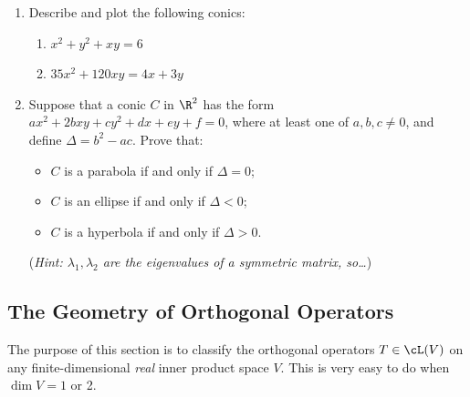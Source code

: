 \begin{exercises}
\begin{enumerate}[label=\thesubsection.\arabic*., align=right]
  \item Describe and plot the following conics:
  \begin{enumerate}
    \item $x^2+y^2+xy=6$
    
    \item $35x^2+120xy=4x+3y$
  \end{enumerate}
  
  \item Suppose that a conic $C$ in $\R^2$ has the form $ax^2+2bxy+cy^2+dx+ey+f=0$, where at least one of $a,b,c\neq 0$, and define $\Delta=b^2-ac$. Prove that:
  \begin{itemize}
    \item $C$ is a parabola if and only if $\Delta=0$;
    \item $C$ is an ellipse if and only if $\Delta<0$;
    \item $C$ is a hyperbola if and only if $\Delta>0$.
  \end{itemize}
  (\emph{Hint: $\lambda_1,\lambda_2$ are the eigenvalues of a symmetric matrix, so\ldots})
  
\end{enumerate}
\end{exercises}\clearpage

\setcounter{subsection}{10}
\subsection{The Geometry of Orthogonal Operators}

The purpose of this section is to classify the orthogonal operators $T\in\cL(V)$ on any finite-dimensional \emph{real} inner product space $V$. This is very easy to do when $\dim V=1$ or 2.

